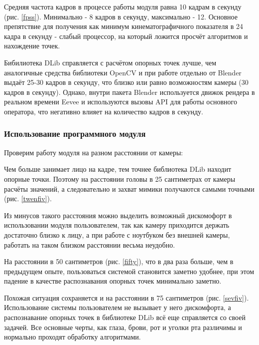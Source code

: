 Средняя частота кадров в процессе работы модуля равна 10 кадрам в секунду (рис. \ref{fpss}). Минимально - 8 кадров в секунду, максимально - 12. Основное препятствие для получения как минимум кинематографичного показателя в 24 кадра в секунду - слабый процессор, на который ложится просчёт алгоритмов и нахождение точек.

Бибилиотека DLib справляется с расчётом опорных точек лучше, чем аналогичные средства библиотеки OpenCV и при работе отдельно от Blender выдаёт 25-30 кадров в секунду, что близко или равно возможностям камеры (30 кадров в секунду). Однако, внутри пакета Blender используется движок рендера в реальном времени Eevee и используются вызовы API для работы основного оператора, что негативно влияет на количество кадров  в секунду.



\subsubsection {Использование программного модуля}

Проверим работу модуля на разном расстоянии от камеры: 

Чем больше занимает лицо на кадре, тем точнее библиотека DLib находит опорные точки. Поэтому на расстоянии головы в 25 сантиметрах от камеры расчёты значений, а следовательно и захват мимики получаются самыми точными (рис. \ref{twenfiv}).

Из минусов такого расстояния можно выделить возможный дискомофорт в использовании модуля пользователем, так как камеру приходится держать достаточно близко к лицу, а при работе с ноутбуком без внешней камеры, работать на таком близком расстоянии весьма неудобно.


На расстоянии в 50 сантиметров (рис. \ref{fifty}), что в два раза больше, чем в предыдущем опыте, пользоваться системой становится заметно удобнее, при этом падение в качестве распознавания опорных точек минимально заметно.


Похожая ситуация сохраняется и на расстоянии в 75 сантиметров (рис. \ref{sevfiv}). Использование системы пользователем не вызывает у него дискомфорта, а распознавание опорных точек в библиотеке DLib всё еще справляется со своей задачей. Все основные черты, как глаза, брови, рот и уголки рта различимы и нормально проходят обработку алгоритмами.

